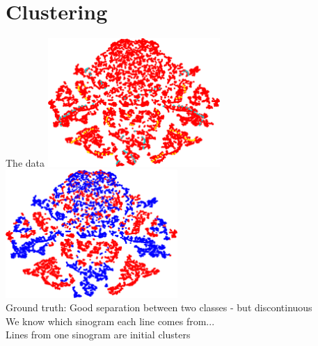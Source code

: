 \documentclass[t, 11pt, xcolor=dvipsnames]{beamer}
\begin{document}
\section{Clustering}
\begin{frame}{The data}
  \includegraphics[width=0.49\textwidth]{images/figures/TSNE_raw_cyan.png}
  \pause
  \includegraphics[width=0.49\textwidth]{images/figures/TSNE_gt.png}\\
  Ground truth: Good separation between two classes - but discontinuous \\
  \pause
  We know which sinogram each line comes from... \\
  Lines from one sinogram are initial clusters


\end{frame}
\end{document}
